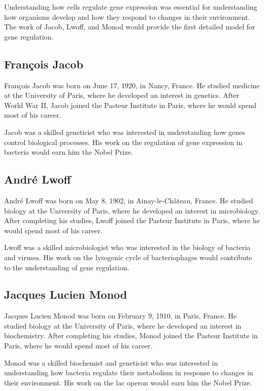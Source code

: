 Understanding how cells regulate gene expression was essential for understanding how organisms develop and how they respond to changes in their environment. The work of Jacob, Lwoff, and Monod would provide the first detailed model for gene regulation.

\subsection{Fran\c{c}ois Jacob}

Fran\c{c}ois Jacob was born on June 17, 1920, in Nancy, France. He studied medicine at the University of Paris, where he developed an interest in genetics. After World War II, Jacob joined the Pasteur Institute in Paris, where he would spend most of his career.

Jacob was a skilled geneticist who was interested in understanding how genes control biological processes. His work on the regulation of gene expression in bacteria would earn him the Nobel Prize.

\subsection{Andr\'e Lwoff}

Andr\'e Lwoff was born on May 8, 1902, in Ainay-le-Ch\^ateau, France. He studied biology at the University of Paris, where he developed an interest in microbiology. After completing his studies, Lwoff joined the Pasteur Institute in Paris, where he would spend most of his career.

Lwoff was a skilled microbiologist who was interested in the biology of bacteria and viruses. His work on the lysogenic cycle of bacteriophages would contribute to the understanding of gene regulation.

\subsection{Jacques Lucien Monod}

Jacques Lucien Monod was born on February 9, 1910, in Paris, France. He studied biology at the University of Paris, where he developed an interest in biochemistry. After completing his studies, Monod joined the Pasteur Institute in Paris, where he would spend most of his career.

Monod was a skilled biochemist and geneticist who was interested in understanding how bacteria regulate their metabolism in response to changes in their environment. His work on the lac operon would earn him the Nobel Prize.

